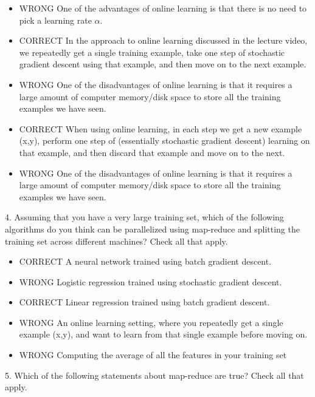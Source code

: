 \documentclass[11pt]{article} %
\begin{document}
 \begin{itemize}

\item WRONG One of the advantages of online learning is that there is no need to pick a learning rate $\alpha$.

\item CORRECT In the approach to online learning discussed in the lecture video, we repeatedly get a single training example, take one step of stochastic gradient descent using that example, and then move on to the next example.

\item WRONG One of the disadvantages of online learning is that it requires a large amount of computer memory/disk space to store all the training examples we have seen.

\item CORRECT When using online learning, in each step we get a new example (x,y), perform one step of (essentially stochastic gradient descent) learning on that example, and then discard that example and move on to the next.

\item WRONG One of the disadvantages of online learning is that it requires a large amount of computer memory/disk space to store all the training examples we have seen.

\end{itemize}
4. 
Assuming that you have a very large training set, which of the following algorithms do you think can be parallelized using map-reduce and splitting the training set across different machines? Check all that apply.


\begin{itemize}

\item CORRECT A neural network trained using batch gradient descent.

\item WRONG Logistic regression trained using stochastic gradient descent.

\item CORRECT Linear regression trained using batch gradient descent.

\item WRONG An online learning setting, where you repeatedly get a single example (x,y), and want to learn from that single example before moving on.

\item WRONG Computing the average of all the features in your training set %

\end{itemize}
5. 
Which of the following statements about map-reduce are true? Check all that apply.
\end{document}
